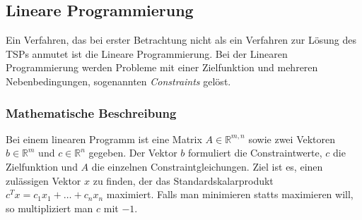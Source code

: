 \documentclass[a4paper, 11pt]{article}
\begin{document}
\subsection{Lineare Programmierung}

Ein Verfahren, das bei erster Betrachtung nicht als ein Verfahren zur Lösung
des TSPs anmutet ist die Lineare Programmierung. Bei der Linearen Programmierung
werden Probleme mit einer Zielfunktion und mehreren Nebenbedingungen,
sogenannten \textit{Constraints} gelöst.

\subsubsection{Mathematische Beschreibung}
Bei einem linearen Programm ist eine Matrix $A \in \mathbb{R}^{m,n}$ sowie
zwei Vektoren $b \in \mathbb{R}^m$ und $c \in \mathbb{R}^n$ gegeben. Der
Vektor $b$ formuliert die Constraintwerte, $c$ die Zielfunktion und $A$ die
einzelnen Constraintgleichungen. Ziel ist es, einen
zulässigen Vektor $x$ zu finden, der das Standardskalarprodukt
$c^Tx = c_1x_1 + \ldots + c_nx_n$ maximiert. Falls man minimieren statts
maximieren will, so multipliziert man $c$ mit $-1$. 
\end{document}
